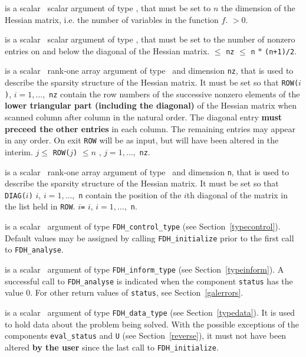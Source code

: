 \documentclass{galahad}
\newcommand{\packagename}{FDH}
\begin{document}
\vspace*{-2mm}
\begin{description}
is a scalar \intentin\ scalar argument of type \integer, that must be 
set to $n$ the dimension of the Hessian matrix, i.e. the number of
variables in the function $f$. 
 $> 0$.

is a scalar \intentin\ scalar argument of type \integer, that must be
set to the number of nonzero entries on and below the diagonal of the Hessian
matrix.
 $\le$ {\tt nz} $\le$ {\tt n} $\ast$ {\tt (n+1)/2}.

 is a scalar \intentinout\ rank-one array argument of type 
\integer\ and dimension {\tt nz}, that is used to describe 
the sparsity structure of the Hessian matrix. It must be set so that
 {\tt ROW(}$i${\tt)}, $i = 1, \ldots,$ {\tt nz} contain the row 
numbers of the successive nonzero elements of the {\bf lower triangular part
(including the diagonal)} of the Hessian matrix when scanned column after
column in the natural order. The diagonal entry 
{\bf must preceed the other entries} in each column. The remaining entries 
may appear in any order. On exit {\tt ROW} will be as input, but will have
been altered in the interim.
\restrictions 
$j \leq$ {\tt ROW(}$j${\tt)} $\leq n$ , $j = 1, \ldots,$ {\tt nz}.

is a scalar \intentin\ rank-one array argument of type 
\integer\ and dimension {\tt n}, that is used to describe 
the sparsity structure of the Hessian matrix. It must be set so that
 {\tt DIAG(}$i${\tt)} $i$, $i = 1, \ldots,$ {\tt n}
contain the position of the $i$th diagonal of the matrix in the list held
in {\tt ROW}.
$i${\tt=} $i$, $i = 1, \ldots,$ {\tt n}.

 is a scalar \intentin\ argument of type 
{\tt \packagename\_control\_type}
(see Section~\ref{typecontrol}). Default values may be assigned by calling 
{\tt \packagename\_initialize} prior to the first call to 
{\tt \packagename\_analyse}. 

 is a scalar \intentinout\ argument of type 
{\tt \packagename\_inform\_type}
(see Section~\ref{typeinform}). 
A successful call to
{\tt \packagename\_analyse}
is indicated when the  component {\tt status} has the value 0. 
For other return values of {\tt status}, see Section~\ref{galerrors}.

 is a scalar \intentinout\ argument of type 
{\tt \packagename\_data\_type}
(see Section~\ref{typedata}). It is used to hold data about the problem being 
solved. With the possible exceptions of the components 
{\tt eval\_status} and {\tt U} (see Section~\ref{reverse}), 
it must not have been altered {\bf by the user} since the last call to 
{\tt \packagename\_initialize}.

\end{description}
\end{document}
